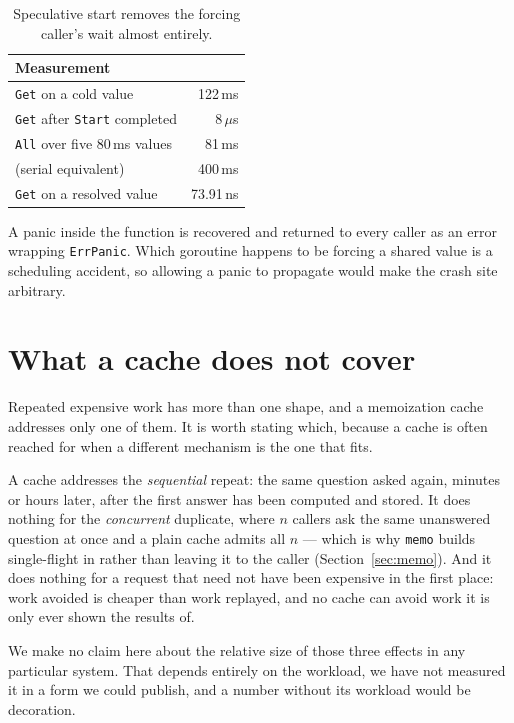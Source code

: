 \documentclass[10pt,twocolumn]{article}
\begin{document}
\begin{table}[h]\centering\small
\begin{tabular}{lr}
\toprule
Measurement & \\
\midrule
\texttt{Get} on a cold value & 122\,ms \\
\texttt{Get} after \texttt{Start} completed & $8\,\mu$s \\
\texttt{All} over five 80\,ms values & 81\,ms \\
\quad (serial equivalent) & 400\,ms \\
\texttt{Get} on a resolved value & 73.91\,ns \\
\bottomrule
\end{tabular}
\caption{Speculative start removes the forcing caller's wait almost entirely.}
\end{table}

A panic inside the function is recovered and returned to every caller as an error
wrapping \texttt{ErrPanic}. Which goroutine happens to be forcing a shared value
is a scheduling accident, so allowing a panic to propagate would make the crash
site arbitrary.

\section{What a cache does not cover}

Repeated expensive work has more than one shape, and a memoization cache
addresses only one of them. It is worth stating which, because a cache is often
reached for when a different mechanism is the one that fits.

A cache addresses the \emph{sequential} repeat: the same question asked again,
minutes or hours later, after the first answer has been computed and stored. It
does nothing for the \emph{concurrent} duplicate, where $n$ callers ask the same
unanswered question at once and a plain cache admits all $n$ --- which is why
\texttt{memo} builds single-flight in rather than leaving it to the caller
(Section~\ref{sec:memo}). And it does nothing for a request that need not have
been expensive in the first place: work avoided is cheaper than work replayed,
and no cache can avoid work it is only ever shown the results of.

We make no claim here about the relative size of those three effects in any
particular system. That depends entirely on the workload, we have not measured
it in a form we could publish, and a number without its workload would be
decoration.
\end{document}
